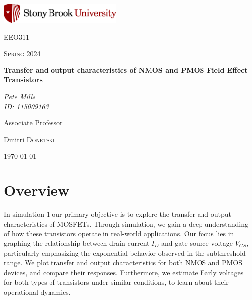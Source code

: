 \documentclass{article}
\begin{document}
	
\begin{titlepage}
	\centering
	\includegraphics[width=0.45\textwidth]{sbu}\par\vspace{1cm}
	{\LARGE \textsc{EEO311}\par}
	\vspace{1cm}
	{\Large \textsc{Spring 2024}\par}
	\vspace{1.5cm}
	{\huge\bfseries Transfer and output characteristics of NMOS and PMOS Field Effect Transistors\par}
	\vspace{2cm}
	{\Large\itshape Pete Mills\\ID: 115009163\par}
	\vfill
	Associate Professor\par
	Dmitri \textsc{Donetski}

	\vfill

	{\large \today\par}
\end{titlepage}

	\newcommand{\assName}{EEO311 Simulation 1_S24.pdf}

	
	
	

	\section*{Overview}
	
	 In simulation 1 our primary objective is to explore the transfer and output characteristics of MOSFETs. Through simulation, we gain a deep understanding of how these transistors operate in real-world applications. Our focus lies in graphing the relationship between drain current $I_D$ and gate-source voltage $V_{GS}$, particularly emphasizing the exponential behavior observed in the subthreshold range. We plot transfer and output characteristics for both NMOS and PMOS devices, and compare their responses. Furthermore, we estimate Early voltages for both types of transistors under similar conditions, to learn about their operational dynamics. 
\end{document}
